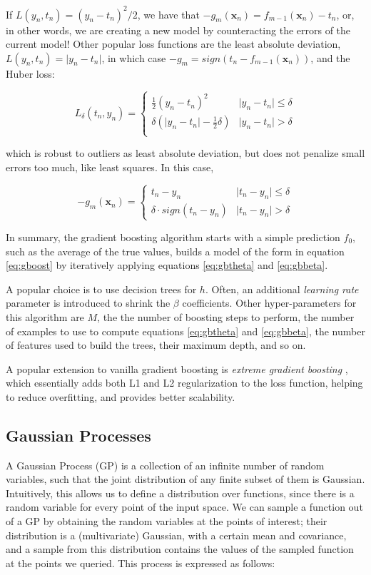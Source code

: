 \documentclass[a4paper]{book}
\begin{document}
If $L(y_n,t_n)=(y_n-t_n)^2/2$, we have that $-g_m(\bm x_n)=f_{m-1}(\bm x_n)-t_n$, or, in other words, we are creating a new model by counteracting the errors of the current model! Other popular loss functions are the least absolute deviation, $L(y_n,t_n)=\vert y_n-t_n\vert$, in which case $-g_m=sign(t_n-f_{m-1}(\bm x_n))$, and the Huber loss:

\begin{equation}
\label{eq:huberloss}
L_\delta(t_n,y_n)=\begin{cases}
\frac{1}{2}(y_n-t_n)^2 & \vert y_n-t_n \vert \leq \delta \\
\delta(\vert y_n-t_n\vert-\frac{1}{2}\delta) & \vert y_n-t_n \vert > \delta \\
\end{cases}
\end{equation}

\noindent which is robust to outliers as least absolute deviation, but does not penalize small errors too much, like least squares. In this case,

\begin{equation}
-g_m(\bm x_n)=\begin{cases}
t_n-y_n & \vert t_n-y_n\vert\leq\delta \\
\delta\cdot sign(t_n-y_n) & \vert t_n-y_n\vert>\delta
\end{cases}
\end{equation}

In summary, the gradient boosting algorithm starts with a simple prediction $f_0$, such as the average of the true values, builds a model of the form in equation \ref{eq:gboost} by iteratively applying equations \ref{eq:gbtheta} and \ref{eq:gbbeta}.

A popular choice is to use decision trees for $h$. Often, an additional \emph{learning rate} parameter is introduced to shrink the $\beta$ coefficients. Other hyper-parameters for this algorithm are $M$, the the number of boosting steps to perform, the number of examples to use to compute equations \ref{eq:gbtheta} and \ref{eq:gbbeta}, the number of features used to build the trees, their maximum depth, and so on.

A popular extension to vanilla gradient boosting is \emph{extreme gradient boosting} \citep{xgboost}, which essentially adds both L1 and L2 regularization to the loss function, helping to reduce overfitting, and provides better scalability.

\subsection{Gaussian Processes}
A Gaussian Process (GP) is a collection of an infinite number of random variables, such that the joint distribution of any finite subset of them is Gaussian. Intuitively, this allows us to define a distribution over functions, since there is a random variable for every point of the input space. We can sample a function out of a GP by obtaining the random variables at the points of interest; their distribution is a (multivariate) Gaussian, with a certain mean and covariance, and a sample from this distribution contains the values of the sampled function at the points we queried. This process is expressed as follows:
\end{document}
